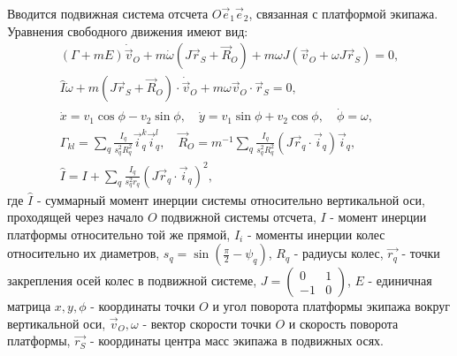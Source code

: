 Вводится подвижная система отсчета $O\vec{e}_1\vec{e}_2$, связанная с платформой экипажа. Уравнения свободного движения имеют вид:
\begin{eqnarray*}
    (\Gamma+mE)\dot{\vec{v}}_O + m\dot{\omega}(J\vec{r}_S+\vec{R}_O)+m\omega J(\vec{v}_O + \omega J\vec{r}_S) = 0,\\
    \hat{I}\dot{\omega} + m(J\vec{r}_S+\vec{R}_O)\cdot\dot{\vec{v}}_O+m\omega\vec{v}_O\cdot\vec{r}_S = 0,\\
    \dot{x} = v_1\cos\phi - v_2\sin\phi, \quad \dot{y} = v_1\sin\phi + v_2\cos\phi, \quad \dot{\phi} = \omega,\\
    \Gamma_{kl} = \sum_q \frac{I_q}{s_q^2 R_q^2}\vec{i}_q^k\vec{i}_q^l, \quad \vec{R}_O = m^{-1}\sum_q \frac{I_q}{s_q^2 R_q^2}(J\vec{r}_q\cdot \vec{i}_q) \vec{i}_q,\\
    \hat{I} = I + \sum_q \frac{I_q}{s_q^2 r_q}(J\vec{r}_q\cdot \vec{i}_q)^2,
\end{eqnarray*}
\newline
где $\hat{I}$ - суммарный момент инерции системы относительно вертикальной оси, проходящей через начало $O$ подвижной системы отсчета,\newline
$I$ - момент инерции платформы относительно той же прямой,\newline
$I_i$ - моменты инерции колес относительно их диаметров,\newline
$s_q = \sin(\frac{\pi}{2} - \psi_q)$, \quad $R_q$ - радиусы колес,\newline
$\vec{r_q}$ - точки закрепления осей колес в подвижной системе,\newline
$J = \left(\begin{array}{cc}0 & 1\\-1 & 0\end{array}\right)$,
\quad $E$ - единичная матрица\newline
$x,y,\phi$ - координаты точки $O$ и угол поворота платформы экипажа вокруг вертикальной оси,\newline
$\vec{v}_O, \omega$ - вектор скорости точки $O$ и скорость поворота платформы,\newline
$\vec{r_S}$ - координаты центра масс экипажа в подвижных осях.

